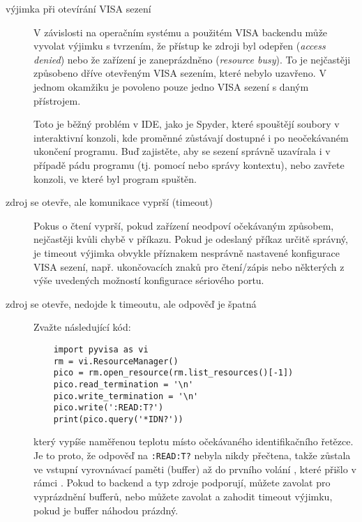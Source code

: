 \begin{description}
    \item[výjimka při otevírání VISA sezení] V závislosti na operačním systému a použitém VISA backendu může  vyvolat výjimku s tvrzením, že přístup ke zdroji byl odepřen (\emph{access denied}) nebo že zařízení je zaneprázdněno (\emph{resource busy}). To je nejčastěji způsobeno dříve otevřeným VISA sezením, které nebylo uzavřeno. V jednom okamžiku je povoleno pouze jedno VISA sezení s daným přístrojem.
    
    Toto je běžný problém v IDE, jako je Spyder, které spouštějí soubory v interaktivní konzoli, kde proměnné zůstávají dostupné i po neočekávaném ukončení programu. Buď zajistěte, aby se sezení správně uzavírala i v případě pádu programu (tj. pomocí  nebo správy kontextu), nebo zavřete konzoli, ve které byl program spuštěn.

    \item[zdroj se otevře, ale komunikace vyprší (timeout)] Pokus o čtení vyprší, pokud zařízení neodpoví očekávaným způsobem, nejčastěji kvůli chybě v příkazu. Pokud je odeslaný příkaz určitě správný, je timeout výjimka obvykle příznakem nesprávně nastavené konfigurace VISA sezení, např. ukončovacích znaků pro čtení/zápis nebo některých z výše uvedených možností konfigurace sériového portu.
    
    \item[zdroj se otevře, nedojde k timeoutu, ale odpověď je špatná] Zvažte následující kód:
\begin{lstlisting}
    import pyvisa as vi
    rm = vi.ResourceManager()
    pico = rm.open_resource(rm.list_resources()[-1])    
    pico.read_termination = '\n'
    pico.write_termination = '\n'
    pico.write(':READ:T?')
    print(pico.query('*IDN?'))
\end{lstlisting}
    který vypíše naměřenou teplotu místo očekávaného identifikačního řetězce. Je to proto, že odpověď na \verb|:READ:T?| nebyla nikdy přečtena, takže zůstala ve vstupní vyrovnávací paměti (buffer) až do prvního volání , které přišlo v rámci . Pokud to backend a typ zdroje podporují, můžete zavolat  pro vyprázdnění bufferů, nebo můžete zavolat  a zahodit timeout výjimku, pokud je buffer náhodou prázdný.
\end{description}